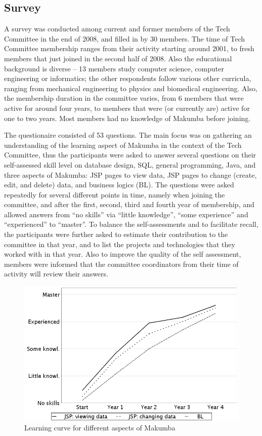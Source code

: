 \documentclass{sig-alt-release2}
\begin{document}
\subsection{Survey}\label{sec:techCommittee-survey}
A survey was conducted among current and former members of the Tech Committee in the end of 2008, and filled in by 30 members. The time of Tech Committee membership ranges from their activity starting around 2001, to fresh members that just joined in the second half of 2008. Also the educational background is diverse -- 13 members study computer science, computer engineering or informatics; the other respondents follow various other curricula, ranging from mechanical engineering to physics and biomedical engineering. Also, the membership duration in the committee varies, from 6 members that were active for around four years, to members that were (or currently are) active for one to two years. Most members had no knowledge of Makumba before joining.

The questionaire consisted of 53 questions. The main focus was on gathering an understanding of the learning aspect of Makumba in the context of the Tech Committee, thus the participants were asked to answer several questions on their self-assessed skill level on database design, SQL, general programming, Java, and three aspects of Makumba: JSP pages to view data, JSP pages to change (create, edit, and delete) data, and business logics (BL). The questions were asked repeatedly for several different points in time, namely when joining the committee, and after the first, second, third and fourth year of membership, and allowed answers from ``no skills'' via ``little knowledge'', ``some experience'' and ``experienced'' to ``master''. To balance the self-assessments and to facilitate recall, the participants were further asked to estimate their contribution to the committee in that year, and to list the projects and technologies that they worked with in that year. Also to improve the quality of the self assessment, members were informed that the committee coordinators from their time of activity will review their answers.

\begin{figure}
  \includegraphics[width=0.98\columnwidth]{figures/learning-technologies}
  \caption{Learning curve for different aspects of Makumba}
  \label{fig:learning-technologies}
\end{figure} 
\end{document}
